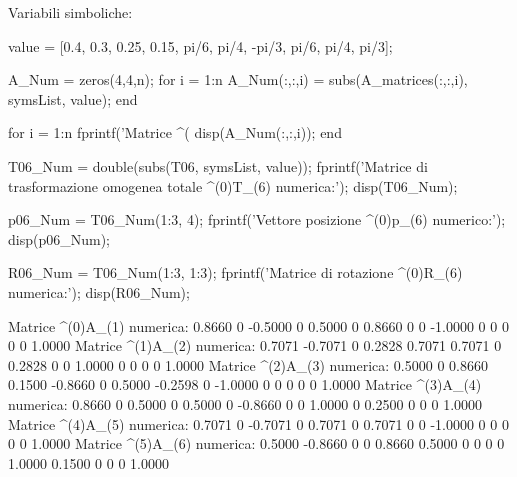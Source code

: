 \documentclass[11pt, a4paper]{article}
\begin{document}
\begin{matlaboutput}
Variabili simboliche:
\end{matlaboutput}

\newpage

\begin{matlabcode}
value = [0.4, 0.3, 0.25, 0.15, pi/6, pi/4, -pi/3, pi/6, pi/4, pi/3];

A_Num = zeros(4,4,n);
for i = 1:n
    A_Num(:,:,i) = subs(A_matrices(:,:,i), symsList, value);
end

for i = 1:n
    fprintf('Matrice ^(%
    disp(A_Num(:,:,i));
end

T06_Num = double(subs(T06, symsList, value));
fprintf('Matrice di trasformazione omogenea totale ^(0)T_(6) numerica:\n');
disp(T06_Num);

p06_Num = T06_Num(1:3, 4);
fprintf('Vettore posizione ^(0)p_(6) numerico:\n');
disp(p06_Num);

R06_Num = T06_Num(1:3, 1:3);
fprintf('Matrice di rotazione ^(0)R_(6) numerica:\n');
disp(R06_Num);
\end{matlabcode}
\begin{matlaboutput}
Matrice ^(0)A_(1) numerica:
    0.8660         0   -0.5000         0
    0.5000         0    0.8660         0
         0   -1.0000         0         0
         0         0         0    1.0000
Matrice ^(1)A_(2) numerica:
    0.7071   -0.7071         0    0.2828
    0.7071    0.7071         0    0.2828
         0         0    1.0000         0
         0         0         0    1.0000
Matrice ^(2)A_(3) numerica:
    0.5000         0    0.8660    0.1500
   -0.8660         0    0.5000   -0.2598
         0   -1.0000         0         0
         0         0         0    1.0000
Matrice ^(3)A_(4) numerica:
    0.8660         0    0.5000         0
    0.5000         0   -0.8660         0
         0    1.0000         0    0.2500
         0         0         0    1.0000
Matrice ^(4)A_(5) numerica:
    0.7071         0   -0.7071         0
    0.7071         0    0.7071         0
         0   -1.0000         0         0
         0         0         0    1.0000
Matrice ^(5)A_(6) numerica:
    0.5000   -0.8660         0         0
    0.8660    0.5000         0         0
         0         0    1.0000    0.1500
         0         0         0    1.0000
\end{matlaboutput}
\end{document}

